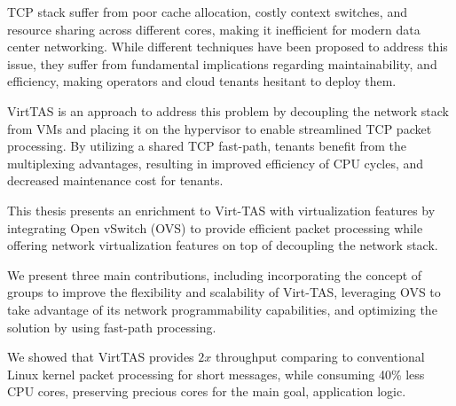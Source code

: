 TCP stack suffer from poor cache allocation, 
costly context switches, and resource sharing across 
different cores, making it inefficient for modern 
data center networking. While different techniques 
have been proposed to address this issue, they suffer 
from fundamental implications regarding maintainability, and
efficiency, making operators 
and cloud tenants hesitant to deploy them. 

VirtTAS is an approach to address this problem by decoupling the 
network stack from VMs and placing it on the hypervisor to enable 
streamlined TCP packet processing. By utilizing a shared TCP fast-path,
 tenants benefit from the multiplexing advantages, resulting in 
improved efficiency of CPU cycles, and decreased maintenance cost 
for tenants.

This thesis presents an enrichment to Virt-TAS with 
virtualization features by integrating Open vSwitch 
(OVS) to provide efficient packet processing while 
offering network virtualization features on top of 
decoupling the network stack. 

We present three main contributions, including 
incorporating the concept of groups to improve the flexibility 
and scalability of Virt-TAS, leveraging OVS to take advantage 
of its network programmability capabilities, 
and optimizing the solution by using fast-path processing. 

We showed that VirtTAS provides \(2x\) throughput comparing to conventional
Linux kernel packet processing for short messages, while 
consuming 40\% less CPU cores, preserving precious cores 
for the main goal, application logic.